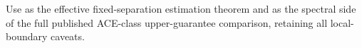 Use as the effective fixed-separation estimation theorem and as the spectral side of the full published ACE-class upper-guarantee comparison, retaining all local-boundary caveats.
